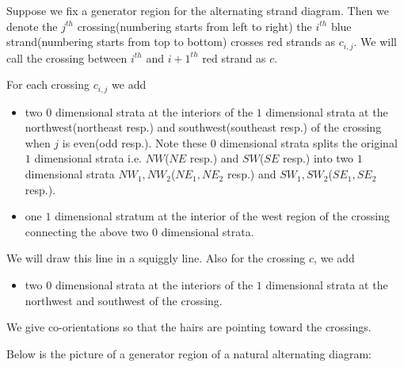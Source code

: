 \begin{definition}
Suppose we fix a generator region for the alternating strand diagram. Then we denote the $j^{th}$ crossing(numbering starts from left to right) the $i^{th}$ blue strand(numbering starts from top to bottom) crosses red strands as $c_{i,j}$. We will call the crossing between $i^{th}$ and $i+1^{th}$ red strand as $c$.

For each crossing $c_{i,j}$ we add 

\begin{itemize}
\item two $0$ dimensional strata at the interiors of the $1$ dimensional strata at the northwest(northeast resp.) and southwest(southeast resp.) of the crossing when $j$ is even(odd resp.). Note these $0$ dimensional strata splits the original $1$ dimensional strata i.e. $NW$($NE$ resp.) and $SW$($SE$ resp.) into two $1$ dimensional strata $NW_1,NW_2$($NE_1,NE_2$ resp.) and $SW_1,SW_2$($SE_1,SE_2$ resp.).
\item one $1$ dimensional stratum at the interior of the west region of the crossing connecting the above two $0$ dimensional strata. 
\end{itemize}

We will draw this line in a squiggly line. Also for the crossing $c$, we add

\begin{itemize}
\item two $0$ dimensional strata at the interiors of the $1$ dimensional strata at the northwest and southwest of the crossing.
\end{itemize}

We give co-orientations so that the hairs are pointing toward the crossings.
 
Below is the picture of a generator region of a natural alternating diagram:


\end{definition}
